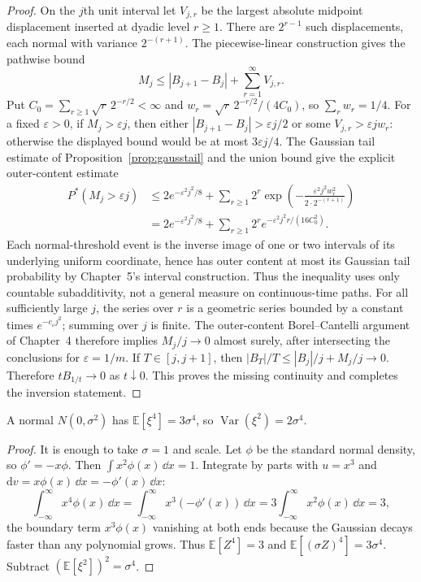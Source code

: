 \begin{proof}
On the $j$th unit interval let $V_{j,r}$ be the largest absolute midpoint displacement inserted at dyadic level $r\ge1$. There are $2^{r-1}$ such displacements, each normal with variance $2^{-(r+1)}$. The piecewise-linear construction gives the pathwise bound
\[
 M_j\le |B_{j+1}-B_j|+\sum_{r=1}^\infty V_{j,r}.
\]
Put $C_0=\sum_{r\ge1}\sqrt r\,2^{-r/2}<\infty$ and
$w_r=\sqrt r\,2^{-r/2}/(4C_0)$, so $\sum_rw_r=1/4$. For a fixed $\varepsilon>0$, if $M_j>\varepsilon j$, then either $|B_{j+1}-B_j|>\varepsilon j/2$ or some $V_{j,r}>\varepsilon j w_r$: otherwise the displayed bound would be at most $3\varepsilon j/4$. The Gaussian tail estimate of Proposition~\ref{prop:gausstail} and the union bound give the explicit outer-content estimate
\[
\begin{aligned}
P^*(M_j>\varepsilon j)
&\le 2e^{-\varepsilon^2j^2/8}
 +\sum_{r\ge1}2^r
   \exp\!\left(-\frac{\varepsilon^2j^2w_r^2}{2\cdot2^{-(r+1)}}\right)\\
&=2e^{-\varepsilon^2j^2/8}
 +\sum_{r\ge1}2^r e^{-\varepsilon^2j^2r/(16C_0^2)}.
\end{aligned}
\]
Each normal-threshold event is the inverse image of one or two intervals of its underlying uniform coordinate, hence has outer content at most its Gaussian tail probability by Chapter~5's interval construction. Thus the inequality uses only countable subadditivity, not a general measure on continuous-time paths. For all sufficiently large $j$, the series over $r$ is a geometric series bounded by a constant times $e^{-c_\varepsilon j^2}$; summing over $j$ is finite. The outer-content Borel--Cantelli argument of Chapter~4 therefore implies $M_j/j\to0$ almost surely, after intersecting the conclusions for $\varepsilon=1/m$. If $T\in[j,j+1]$, then $|B_T|/T\le|B_j|/j+M_j/j\to0$. Therefore $tB_{1/t}\to0$ as $t\downarrow0$. This proves the missing continuity and completes the inversion statement.
\end{proof}

\begin{lemma}\label{lem:squares}
A normal $N(0,\sigma^2)$ has $\mathbb E[\xi^4]=3\sigma^4$, so $\operatorname{Var}(\xi^2)=2\sigma^4$.
\end{lemma}
\begin{proof}
It is enough to take $\sigma=1$ and scale. Let $\phi$ be the standard normal density, so $\phi'=-x\phi$. Then $\int x^2\phi(x)\,\dd x=1$. Integrate by parts with $u=x^3$ and $\mathrm dv=x\phi(x)\,\dd x=-\phi'(x)\,\dd x$:
\[
 \int_{-\infty}^{\infty}x^4\phi(x)\,\dd x=\int_{-\infty}^{\infty}x^3(-\phi'(x))\,\dd x=3\int_{-\infty}^{\infty}x^2\phi(x)\,\dd x=3,
\]
the boundary term $x^3\phi(x)$ vanishing at both ends because the Gaussian decays faster than any polynomial grows. Thus $\mathbb E[Z^4]=3$ and $\mathbb E[(\sigma Z)^4]=3\sigma^4$. Subtract $(\mathbb E[\xi^2])^2=\sigma^4$.
\end{proof}

